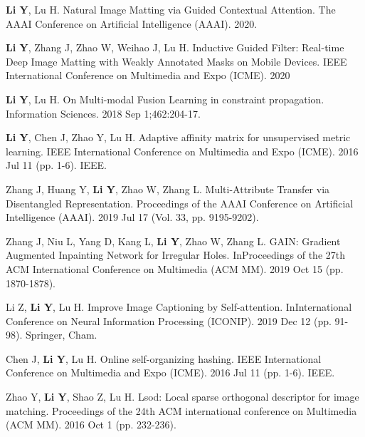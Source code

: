 

\begin{publications}
  \item {\bf{Li Y}}, Lu H. Natural Image Matting via Guided Contextual Attention. The AAAI Conference on Artificial Intelligence (AAAI). 2020.
  \item {\bf{Li Y}}, Zhang J, Zhao W, Weihao J, Lu H. Inductive Guided Filter: Real-time Deep Image Matting with Weakly Annotated Masks on Mobile Devices. IEEE International Conference on Multimedia and Expo (ICME). 2020
  \item {\bf{Li Y}}, Lu H. On Multi-modal Fusion Learning in constraint propagation. Information Sciences. 2018 Sep 1;462:204-17.
  \item {\bf{Li Y}}, Chen J, Zhao Y, Lu H. Adaptive affinity matrix for unsupervised metric learning. IEEE International Conference on Multimedia and Expo (ICME). 2016 Jul 11 (pp. 1-6). IEEE.
  \item Zhang J, Huang Y, {\bf{Li Y}}, Zhao W, Zhang L. Multi-Attribute Transfer via Disentangled Representation. Proceedings of the AAAI Conference on Artificial Intelligence (AAAI). 2019 Jul 17 (Vol. 33, pp. 9195-9202).
  \item Zhang J, Niu L, Yang D, Kang L, {\bf{Li Y}}, Zhao W, Zhang L. GAIN: Gradient Augmented Inpainting Network for Irregular Holes. InProceedings of the 27th ACM International Conference on Multimedia (ACM MM). 2019 Oct 15 (pp. 1870-1878).
  \item Li Z, {\bf{Li Y}}, Lu H. Improve Image Captioning by Self-attention. InInternational Conference on Neural Information Processing (ICONIP). 2019 Dec 12 (pp. 91-98). Springer, Cham.
  \item Chen J, {\bf{Li Y}}, Lu H. Online self-organizing hashing. IEEE International Conference on Multimedia and Expo (ICME). 2016 Jul 11 (pp. 1-6). IEEE.
  \item Zhao Y, {\bf{Li Y}}, Shao Z, Lu H. Lsod: Local sparse orthogonal descriptor for image matching. Proceedings of the 24th ACM international conference on Multimedia (ACM MM). 2016 Oct 1 (pp. 232-236).
\end{publications}

